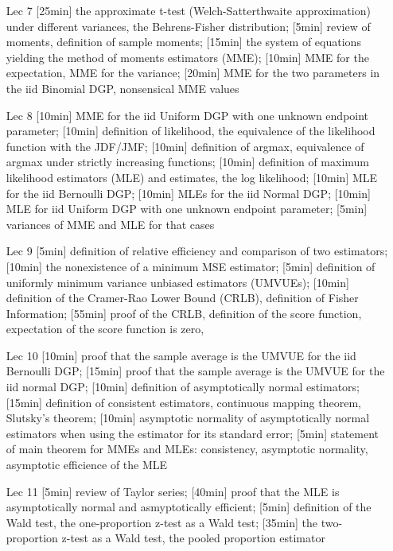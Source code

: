 \documentclass[12pt]{article}
\begin{document}
\begin{enumerate}
\item[Lec 7] [25min] the approximate t-test (Welch-Satterthwaite approximation) under different variances, the Behrens-Fisher distribution; [5min] review of moments, definition of sample moments; [15min] the system of equations yielding the method of moments estimators (MME); [10min] MME for the expectation, MME for the variance; [20min] MME for the two parameters in the iid Binomial DGP, nonsensical MME values

\item[Lec 8] [10min] MME for the iid Uniform DGP with one unknown endpoint parameter; [10min] definition of likelihood, the equivalence of the likelihood function with the JDF/JMF; [10min] definition of argmax, equivalence of argmax under strictly increasing functions; [10min] definition of maximum likelihood estimators (MLE) and estimates, the log likelihood; [10min] MLE for the iid Bernoulli DGP; [10min] MLEs for the iid Normal DGP; [10min] MLE for iid Uniform DGP with one unknown endpoint parameter; [5min] variances of MME and MLE for that cases

\item[Lec 9] [5min] definition of relative efficiency and comparison of two estimators; [10min] the nonexistence of a minimum MSE estimator; [5min] definition of uniformly minimum variance unbiased estimators (UMVUEs); [10min] definition of the Cramer-Rao Lower Bound (CRLB), definition of Fisher Information; [55min] proof of the CRLB, definition of the score function, expectation of the score function is zero,  

\item[Lec 10] [10min] proof that the sample average is the UMVUE for the iid Bernoulli DGP; [15min] proof that the sample average is the UMVUE for the iid normal DGP; [10min] definition of asymptotically normal estimators; [15min] definition of consistent estimators, continuous mapping theorem, Slutsky's theorem; [10min] asymptotic normality of asymptotically normal estimators when using the estimator for its standard error; [5min] statement of main theorem for MMEs and MLEs: consistency, asymptotic normality, asymptotic efficience of the MLE

\item[Lec 11]  [5min] review of Taylor series; [40min] proof that the MLE is asymptotically normal and asmyptotically efficient; [5min] definition of the Wald test, the one-proportion z-test as a Wald test; [35min] the two-proportion z-test as a Wald test, the pooled proportion estimator


\end{enumerate}
\end{document}
